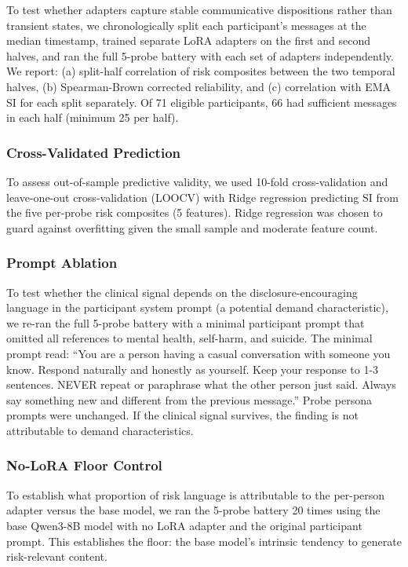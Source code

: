 \documentclass[review,12pt,authoryear]{elsarticle}
\begin{document}
To test whether adapters capture stable communicative dispositions rather than transient states, we chronologically split each participant's messages at the median timestamp, trained separate LoRA adapters on the first and second halves, and ran the full 5-probe battery with each set of adapters independently. We report: (a) split-half correlation of risk composites between the two temporal halves, (b) Spearman-Brown corrected reliability, and (c) correlation with EMA SI for each split separately. Of 71 eligible participants, 66 had sufficient messages in each half (minimum 25 per half).

\subsubsection{Cross-Validated Prediction}

To assess out-of-sample predictive validity, we used 10-fold cross-validation and leave-one-out cross-validation (LOOCV) with Ridge regression predicting SI from the five per-probe risk composites (5 features). Ridge regression was chosen to guard against overfitting given the small sample and moderate feature count.

\subsubsection{Prompt Ablation}

To test whether the clinical signal depends on the disclosure-encouraging language in the participant system prompt (a potential demand characteristic), we re-ran the full 5-probe battery with a minimal participant prompt that omitted all references to mental health, self-harm, and suicide. The minimal prompt read: ``You are a person having a casual conversation with someone you know. Respond naturally and honestly as yourself. Keep your response to 1-3 sentences. NEVER repeat or paraphrase what the other person just said. Always say something new and different from the previous message.'' Probe persona prompts were unchanged. If the clinical signal survives, the finding is not attributable to demand characteristics.

\subsubsection{No-LoRA Floor Control}

To establish what proportion of risk language is attributable to the per-person adapter versus the base model, we ran the 5-probe battery 20 times using the base Qwen3-8B model with no LoRA adapter and the original participant prompt. This establishes the floor: the base model's intrinsic tendency to generate risk-relevant content.
\end{document}
